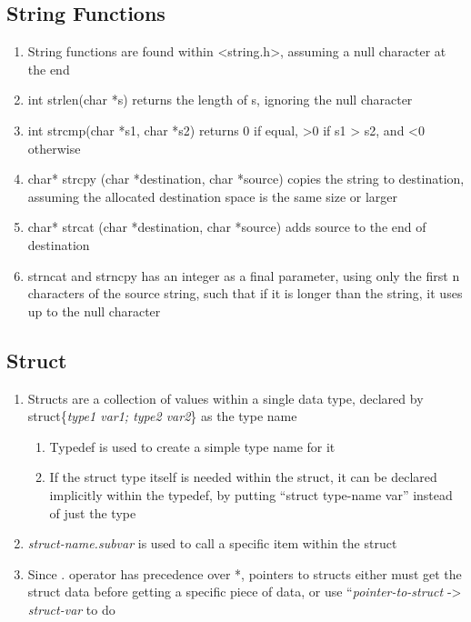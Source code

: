 \documentclass[11 pt, twoside]{article}
\begin{document}
\subsection{String Functions}
\begin{enumerate}
\item String functions are found within <string.h>, assuming a null character at the end
\item int strlen(char *s) returns the length of s, ignoring the null character
\item int strcmp(char *s1, char *s2) returns 0 if equal, >0 if s1 > s2, and <0 otherwise
\item char* strcpy (char *destination, char *source) copies the string to destination, assuming the allocated destination space is the same size or larger
\item char* strcat (char *destination, char *source) adds source to the end of destination
\item strncat and strncpy has an integer as a final parameter, using only the first n characters of the source string, such that if it is longer than the string, it uses up to the null character 
\end{enumerate}
\subsection{Struct}
\begin{enumerate}
\item Structs are a collection of values within a single data type, declared by struct\{\textit{type1 var1; type2 var2}\} as the type name
\begin{enumerate}
\item Typedef is used to create a simple type name for it
\item If the struct type itself is needed within the struct, it can be declared implicitly within the typedef, by putting ``struct type-name var'' instead of just the type
\end{enumerate}
\item \textit{struct-name.subvar} is used to call a specific item within the struct
\item Since . operator has precedence over *, pointers to structs either must get the struct data before getting a specific piece of data, or use ``\textit{pointer-to-struct} -> \textit{struct-var} to do 
\end{enumerate}
\end{document}
